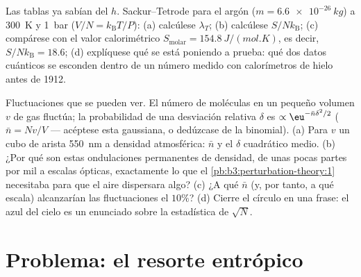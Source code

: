 \begin{exercise}[$\star\star\star$]\label{exo:b3:microcanonical-ensemble:11}
Las tablas ya sabían del $h$. Sackur--Tetrode para el argón ($m =
\qty{6.6e-26}{kg}$) a \qty{300}{K} y \qty{1}{bar} ($V/N =
k_{\text{B}}T/P$): (a) calcúlese $\lambda_T$; (b) calcúlese $S/N
k_{\text{B}}$; (c) compárese con el valor calorimétrico
$S_{\text{molar}} = \qty{154.8}{J/(mol.K)}$, es decir, $S/Nk_{\text{B}}
= 18.6$; (d) explíquese qué se está poniendo a prueba: qué dos datos
cuánticos se esconden dentro de un número medido con calorímetros de hielo
antes de 1912.
\end{exercise}

\begin{exercise}[$\star\star\star$]\label{exo:b3:microcanonical-ensemble:12}
Fluctuaciones que se pueden ver. El número de moléculas en un pequeño
volumen $v$ de gas fluctúa; la probabilidad de una desviación relativa
$\delta$ es $\propto\eu^{-\bar n\delta^2/2}$ ($\bar n = Nv/V$ ---
acéptese esta gaussiana, o dedúzcase de la binomial). (a) Para $v$ un
cubo de arista \qty{550}{nm} a densidad atmosférica: $\bar n$ y
el $\delta$ cuadrático medio. (b) ¿Por qué son estas ondulaciones
permanentes de densidad, de unas pocas partes por mil a escalas ópticas,
exactamente lo que el \cref{pb:b3:perturbation-theory:1} necesitaba para que
el aire dispersara algo? (c) ¿A qué $\bar n$ (y, por tanto, a qué escala)
alcanzarían las fluctuaciones el $10\%$? (d) Cierre el círculo en una
frase: el azul del cielo es un enunciado sobre la estadística de $\sqrt N$.
\end{exercise}

\section{Problema: el resorte entrópico}

